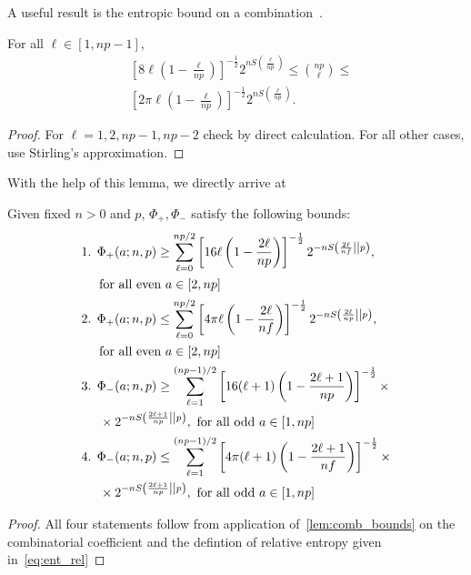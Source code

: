 A useful result is the entropic bound on a combination~\cite{cit:ash}.
\begin{lemma}\label{lem:comb_bounds}
	For all $\ell\in [1,np-1]$,
	\begin{align}
		&\left[ 8\ell\left(1-\frac{\ell}{np}\right) \right]^{-\frac{1}{2}} 2^{n S\left(\frac{\ell}{np}\right)} \leq \binom{np}{\ell} \leq \\
		&\left[ 2\pi \ell\left(1-\frac{\ell}{np}\right) \right]^{-\frac{1}{2}} 2^{n S\left(\frac{\ell}{np}\right)}.
	\end{align}
\end{lemma}
\begin{proof}
	For $\ell = 1,2, np-1, np-2$ check by direct calculation.	
	For all other cases, use Stirling's approximation. 
\end{proof}
With the help of this lemma, we directly arrive at 
\begin{theorem}\label{thm:bounds_strict}
	Given fixed $n>0$ and $p$, $\Phi_+, \Phi_-$ satisfy the following bounds:
	\begin{align*}
		\begin{split}
		&\text{1. } \Phi_+(a; n, p) \geq \sum\limits_{\ell=0}^{np/2}\left[ 16\ell\left(1-\frac{2\ell}{np}\right) \right]^{-\frac{1}{2}} 2^{-n\ent{\frac{2\ell}{nf}}{p}}, \\
		&\hspace{14pt} \text{for all even } a\in [2,np] \\
		&\text{2. } \Phi_+(a; n, p) \leq \sum\limits_{\ell=0}^{np/2}\left[ 4\pi\ell\left(1-\frac{2\ell}{nf}\right) \right]^{-\frac{1}{2}} 2^{-n\ent{\frac{2\ell}{np}}{p}}, \\
		&\hspace{14pt} \text{for all even } a\in [2,np] \\
		&\text{3. } \Phi_-(a; n, p) \geq \sum\limits_{\ell=1}^{(np-1)/2}\left[ 16(\ell+1)\left(1-\frac{2\ell+1}{np}\right) \right]^{-\frac{1}{2}} \times \\
		&\hspace{14pt} \times 2^{-n\ent{\frac{2\ell+1}{np}}{p}},\ \text{for all odd }a\in [1,np] \\
		&\text{4. } \Phi_-(a; n, p) \leq \sum\limits_{\ell=1}^{(np-1)/2}\left[ 4\pi(\ell+1)\left(1-\frac{2\ell+1}{nf}\right) \right]^{-\frac{1}{2}} \times \\
		&\hspace{14pt} \times 2^{-n\ent{\frac{2\ell+1}{np}}{p}},\ \text{for all odd } a\in [1,np]
		\end{split}
	\end{align*}
\end{theorem}
\begin{proof}
	All four statements follow from application of~\cref{lem:comb_bounds} on the combinatorial coefficient and the defintion of relative entropy given in~\cref{eq:ent_rel}
\end{proof}

